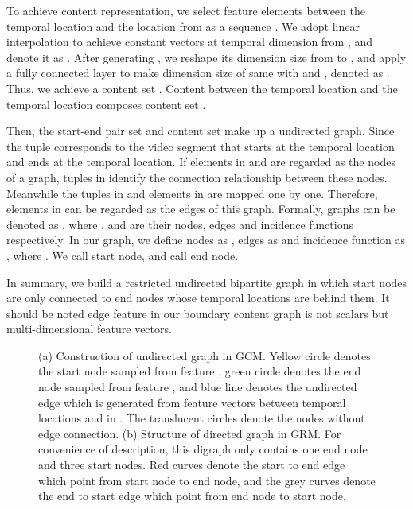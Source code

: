 \documentclass[runningheads]{llncs}
\begin{document}
To achieve content representation, we select feature elements between the  temporal location and the  location from  as a sequence . We adopt linear interpolation to achieve constant  vectors at temporal dimension from , and denote it as . After generating , we reshape its dimension size from  to , and apply a fully connected layer  to make dimension size of  same with  and , denoted as . Thus, we achieve a content set . Content between the  temporal location and the  temporal location composes content set .

Then, the start-end pair set  and content set  make up a undirected graph. Since the tuple  corresponds to the video segment that starts at the  temporal location and ends at the  temporal location. If elements in  and  are regarded as the nodes of a graph, tuples in  identify the connection relationship between these nodes. Meanwhile the tuples in  and elements in  are mapped one by one. Therefore, elements in  can be regarded as the edges of this graph. Formally, graphs can be denoted as , where ,  and  are their nodes, edges and incidence functions respectively. In our graph, we define nodes as , edges as  and incidence function as , where . We call  start node, and call  end node. 

In summary, we build a restricted undirected bipartite graph in which start nodes are only connected to end nodes whose temporal locations are behind them. It should be noted edge feature in our boundary content graph is not scalars but multi-dimensional feature vectors.


\begin{figure}
\centering
\setlength{\belowcaptionskip}{-0.cm}
\quad\quad\quad\quad
{}

\caption{(a) Construction of undirected graph in GCM. Yellow circle denotes the start node  sampled from feature , green circle denotes the end node  sampled from feature , and blue line denotes the undirected edge which is generated from feature vectors between temporal locations  and  in . The translucent circles denote the nodes without edge connection.
 (b) Structure of directed graph in GRM. For convenience of description, this digraph only contains one end node and three start nodes. Red curves denote the start to end edge which point from start node to end node, and the grey curves denote the end to start edge which point from end node to start node. }

\end{figure}
\end{document}
